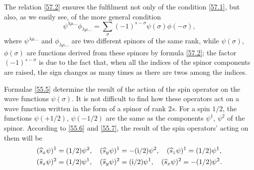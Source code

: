 The relation \eqref{57.2} ensures the fulfilment not only of the condition \eqref{57.1}, but also, as we easily see, of the more general condition
\begin{equation}\label{57.3}
\psi^{\lambda\mu\dots}\phi_{\lambda\mu\dots}=\sum_{\sigma}(-1)^{s-\sigma}\psi(\sigma)\phi(-\sigma),
\end{equation}
where $ \psi^{\lambda\mu\dots} $ and $\phi_{\lambda\mu\dots}$ are two different spinors of the same rank, while $ \psi(\sigma) $, $ \phi(\sigma) $ are functions derived from these spinors by formula \eqref{57.2}; the factor $ (-1)^{s-\sigma} $ is due to the fact that, when all the indices of the spinor components are raised, the sign changes as many times as there are twos among the indices.

Formulae \eqref{55.5} determine the result of the action of the spin operator on the wave functions $\psi(\sigma)$. It is not difficult to find how these operators act on a wave function written in the form of a spinor of rank $ 2s $. For a spin $ 1/2 $, the functions $ \psi(+1/2) $, $ \psi(-1/2) $ are the same as the components $\psi^1$, $ \psi^2 $ of the spinor. According to \eqref{55.6} and \eqref{55.7}, the result of the spin operators’ acting on them will be
\begin{equation}\label{57.4}
\begin{split}
(\widehat{s}_x\psi)^1&=(1/2)\psi^2,\quad(\widehat{s}_y\psi)^1=-(\mathrm{i}/2)\psi^2,\quad(\widehat{s}_z\psi)^1=(1/2)\psi^1,\\
(\widehat{s}_x\psi)^2&=(1/2)\psi^1,\quad(\widehat{s}_y\psi)^2=(\mathrm{i}/2)\psi^1,\quad(\widehat{s}_x\psi)^2=-(1/2)\psi^2.
\end{split}
\end{equation}


